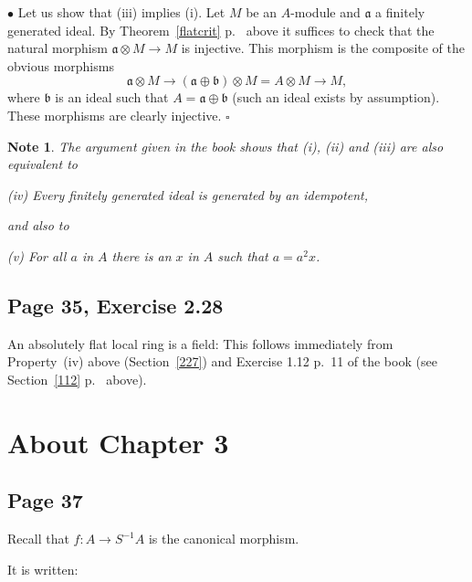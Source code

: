 \documentclass[parskip=half,fontsize=12pt]{scrartcl}%
\newcommand{\mf}{\mathfrak}
\newcommand{\aaa}{\mf a}
\newcommand{\bbb}{\mf b}
\newcommand{\mmm}{\mf m}
\newcommand{\bu}{\bullet}
\newtheorem{note}[thm]{Note}
\begin{document}

$\bu$ Let us show that (iii) implies (i). Let $M$ be an $A$-module and $\aaa$ a finitely generated ideal. By Theorem~\ref{flatcrit} p.~\pageref{flatcrit} above it suffices to check that the natural morphism $\aaa\otimes M\to M$ is injective. This morphism is the composite of the obvious morphisms 
$$
\aaa\otimes M\to(\aaa\oplus\bbb)\otimes M=A\otimes M\to M,
$$ 
where $\bbb$ is an ideal such that $A=\aaa\oplus\bbb$ (such an ideal exists by assumption). These morphisms are clearly injective. $\square$ 

\begin{note}
The argument given in the book shows that (i), (ii) and (iii) are also equivalent to

(iv) Every finitely generated ideal is generated by an idempotent,

and also to 

(v) For all $a$ in $A$ there is an $x$ in $A$ such that $a=a^2x$. 
\end{note}

\subsection{Page 35, Exercise 2.28}\label{228}%

An absolutely flat local ring is a field: This follows immediately from Property~(iv) above (Section~\ref{227}) and Exercise 1.12 p.~11 of the book (see Section~\ref{112} p.~\pageref{112} above). %

\section{About Chapter 3}%

\subsection{Page 37}%

Recall that $f:A\to S^{-1}A$ is the canonical morphism.

It is written:
\end{document}
